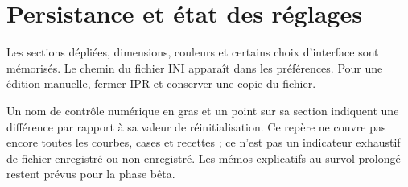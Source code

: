 \section{Persistance et état des réglages}
Les sections dépliées, dimensions, couleurs et certains choix d’interface
sont mémorisés. Le chemin du fichier INI apparaît dans les préférences.
Pour une édition manuelle, fermer IPR et conserver une copie du fichier.

Un nom de contrôle numérique en gras et un point sur sa section indiquent
une différence par rapport à sa valeur de réinitialisation. Ce repère ne
couvre pas encore toutes les courbes, cases et recettes ; ce n’est pas
un indicateur exhaustif de fichier enregistré ou non enregistré.
Les mémos explicatifs au survol prolongé restent prévus pour la phase bêta.
